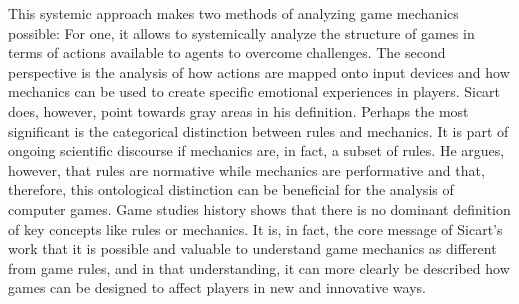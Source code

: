 This systemic approach makes two methods of analyzing game mechanics possible: For one, it allows to systemically analyze the structure of games in terms of actions available to agents to overcome challenges. The second perspective is the analysis of how actions are mapped onto input devices and how mechanics can be used to create specific emotional experiences in players. Sicart does, however, point towards gray areas in his definition. Perhaps the most significant is the categorical distinction between rules and mechanics. It is part of ongoing scientific discourse if mechanics are, in fact, a subset of rules. He argues, however, that rules are normative while mechanics are performative and that, therefore, this ontological distinction can be beneficial for the analysis of computer games. Game studies history shows that there is no dominant definition of key concepts like rules or mechanics. It is, in fact, the core message of Sicart’s work that it is possible and valuable to understand game mechanics as different from game rules, and in that understanding, it can more clearly be described how games can be designed to affect players in new and innovative ways.~\cite{Sicart2008}
